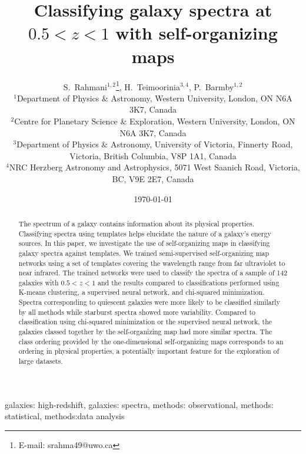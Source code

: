 \documentclass[useAMS,usenatbib]{mn2e}
\begin{document}

\title[Classifying high-$z$ galaxy spectra]{Classifying galaxy spectra at $0.5<z<1$ with self-organizing maps}
\date{\today}
\author[S.~Rahmani, H.~Teimoorinia and P.~Barmby]{S.~Rahmani$^{1,2}$\thanks{E-mail:
srahma49@uwo.ca}, H.~Teimoorinia$^{3,4}$, P.~Barmby$^{1,2}$\\
$^{1}$Department of Physics $\&$ Astronomy, Western University, London, ON N6A 3K7, Canada\\
$^{2}$Centre for Planetary Science \& Exploration, Western University, London, ON N6A 3K7, Canada\\
$^{3}$Department of Physics $\&$ Astronomy, University of Victoria, Finnerty Road, Victoria, British Columbia, V8P 1A1, Canada\\
$^{4}$NRC Herzberg Astronomy and Astrophysics, 5071 West Saanich Road, Victoria, BC, V9E 2E7, Canada }
\maketitle


\begin{abstract}
    The spectrum of a galaxy contains information about its physical properties.
    Classifying spectra using templates helps elucidate the nature of a galaxy's energy sources.
    In this paper, we investigate the use of self-organizing maps in classifying galaxy spectra against templates.
    We trained semi-supervised self-organizing map networks using a set of
    templates covering the wavelength range from far ultraviolet to near infrared. 
    The trained networks were used to classify the spectra of a sample of 142 galaxies with $0.5 < z < 1$ and the results compared to classifications performed using K-means clustering, a supervised neural network, and chi-squared minimization.
    Spectra corresponding to quiescent galaxies were more likely to be classified similarly by all methods while starburst spectra showed more variability.
    Compared to classification using chi-squared minimization or the supervised neural network, the galaxies classed together by the self-organizing map had more similar spectra.
     The class ordering provided by the one-dimensional self-organizing maps corresponds to an ordering in physical properties, a potentially important feature for the exploration of large datasets.
\end{abstract}
\begin{keywords} 
 galaxies: high-redshift, 
 galaxies: spectra, 
 methods: observational, 
 methods: statistical, 
 methods:data analysis
\end{keywords}
\end{document}
